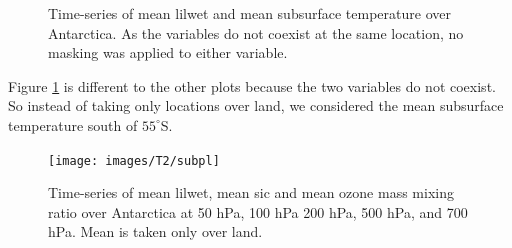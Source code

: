 \documentclass[../main.tex]{subfiles}
\begin{document}
\begin{figure}[hbt!]
\begin{subfigure}[b]{0.45\textwidth}
    \end{subfigure}
    \caption{Time-series of mean \gls{lilwet} and mean subsurface temperature over Antarctica. As the variables do not coexist at the same location, no masking was applied to either variable.}
    \label{fig:timeseries_subsurtemp_100}
\end{figure}

Figure \ref{fig:timeseries_subsurtemp_100} is different to the other plots because the two variables do not coexist. So instead of taking only locations over land, we considered the mean subsurface temperature south of $55^\circ$S. 

\begin{figure}[hbt!]
    \centering
    \texttt{[image: images/T2/subpl]}
    \caption{Time-series of mean \gls{lilwet}, mean \gls{sic} and mean ozone mass mixing ratio over Antarctica at 50 hPa, 100 hPa 200 hPa, 500 hPa, and 700 hPa. Mean is taken only over land.}
    \label{fig:timeseries_o3_50}
\end{figure}
\end{document}
